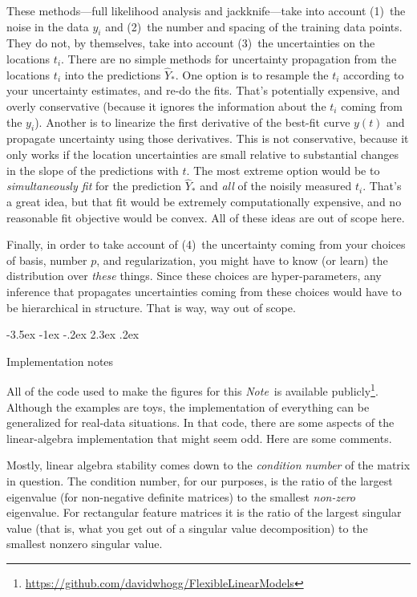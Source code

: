 \documentclass[12pt,letterpaper]{article}
\makeatletter
\renewcommand\section{\@startsection {section}{1}{\z@}%
  {-3.5ex \@plus -1ex \@minus -.2ex}%
  {2.3ex \@plus.2ex}%
  {\raggedright\normalfont\Large\bfseries}}
\newcommand{\documentname}{\textsl{Note}}
\makeatother
\begin{document}
These methods---full likelihood analysis and jackknife---take into account (1)~the noise in the data $y_i$ and (2)~the number and spacing of the training data points.
They do not, by themselves, take into account (3)~the uncertainties on the locations $t_i$.
There are no simple methods for uncertainty propagation from the locations $t_i$ into the predictions $\hat{Y}_\ast$.
One option is to resample the $t_i$ according to your uncertainty estimates, and re-do the fits.
That's potentially expensive, and overly conservative (because it ignores the information about the $t_i$ coming from the $y_i$).
Another is to linearize the first derivative of the best-fit curve $y(t)$ and propagate uncertainty using those derivatives.
This is not conservative, because it only works if the location uncertainties are small relative to substantial changes in the slope of the predictions with $t$.
The most extreme option would be to \emph{simultaneously fit} for the prediction $\hat{Y}_\ast$ and \emph{all} of the noisily measured $t_i$.
That's a great idea, but that fit would be extremely computationally expensive, and no reasonable fit objective would be convex.
All of these ideas are out of scope here.

Finally, in order to take account of (4)~the uncertainty coming from your choices of basis, number $p$, and regularization, you might have to know (or learn) the distribution over \emph{these} things.
Since these choices are hyper-parameters, any inference that propagates uncertainties coming from these choices would have to be hierarchical in structure.
That is way, way out of scope.

\section{Implementation notes}\label{sec:implementation}

All of the code used to make the figures for this \documentname\ is available publicly\footnote{\url{https://github.com/davidwhogg/FlexibleLinearModels}}.
Although the examples are toys, the implementation of everything can be generalized for real-data situations.
In that code, there are some aspects of the linear-algebra implementation that might seem odd.
Here are some comments.

Mostly, linear algebra stability comes down to the \emph{condition number} of the matrix in question.
The condition number, for our purposes, is the ratio of the largest eigenvalue (for non-negative definite matrices) to the smallest \emph{non-zero} eigenvalue.
For rectangular feature matrices it is the ratio of the largest singular value (that is, what you get out of a singular value decomposition) to the smallest nonzero singular value.
\end{document}
